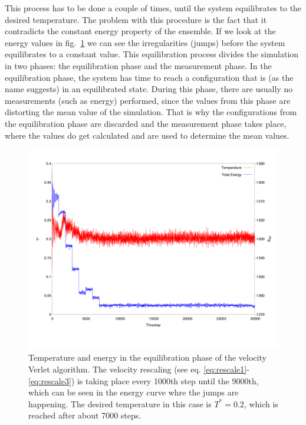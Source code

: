 \documentclass[12pt]{article}
\begin{document}
This process has to be done a couple of times, until the system equilibrates to the desired temperature. The problem with this procedure is the fact
that it contradicts the constant energy property of the ensemble. If we look at the energy values in fig.~\ref{fig:energystart} we can see the
irregularities (jumps) before the system equilibrates to a constant value. This equilibration process divides the simulation in two phases: the equilibration
phase and the measurement phase. In the equilibration phase, the system has time to reach a configuration that is (as the name suggests) in an 
equilibrated state. During this phase, there are usually no measurements (such as energy) performed, since the values from this phase are distorting
the mean value of the simulation. That is why the configurations from the equilibration phase are discarded and the measurement phase takes place, 
where the values do get calculated and are used to determine the mean values.  
\begin{figure}[h]
    \begin{center}
        \includegraphics[scale=0.3]{images/verlet_output_te.pdf}
        \caption{Temperature and energy in the equilibration phase of the velocity Verlet algorithm. The velocity rescaling (see eq. 
        \eqref{eq:rescale1}-\eqref{eq:rescale3}) is taking place every 1000th step until the 9000th, which can be seen in the energy curve whre the
    jumps are happening. The desired temperature in this case is $T^* = 0.2$, which is reached after about 7000 steps.}
        \label{fig:energystart}
    \end{center}
\end{figure}
\end{document}
